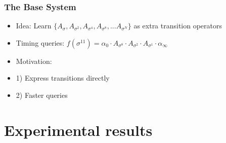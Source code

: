 \documentclass{beamer}
\begin{document}
\begin{frame}
\frametitle{The Base System}
\begin{itemize}

\item Idea: Learn $\{A_{\sigma}, A_{\sigma^2}, A_{\sigma^4}, A_{\sigma^8}, ... A_{\sigma^N}\}$ as extra transition operators

\item Timing queries: $f(\sigma^{11}) = \alpha_0 \cdot A_{\sigma^8} \cdot A_{\sigma^2} \cdot A_{\sigma^1} \cdot \alpha_\infty$

\item Motivation: 
\item[] 1) Express transitions directly
\item[] 2) Faster queries
\end{itemize}
\end{frame}

\section{Experimental results}
\end{document}
